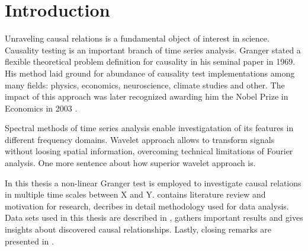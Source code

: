 \section{Introduction}

Unraveling causal relations is a fundamental object of interest in science.
Causality testing is an important branch of time series analysis.
Granger \cite{granger69} stated a flexible theoretical problem definition for causality in his seminal paper in 1969.
His method laid ground for abundance of causality test implementations among many fields:
physics, economics, neuroscience, climate studies and other. 
The impact of this approach was later recognized awarding him the Nobel Prize in Economics in 2003 \cite{nobel2003}. %

Spectral methods of time series analysis enable investigatation of its features in different frequency domains.
Wavelet approach allows to transform signals without loosing spatial information, overcoming technical limitations of Fourier analysis.
One more sentence about how superior wavelet approach is.

In this thesis a non-linear Granger test is employed to investigate causal relations in multiple time scales between X and Y.
 contains literature review and motivation for research,
 decribes in detail methodology used for data analysis.
Data sets used in this thesis are described in ,
 gathers important results and gives insights about discovered causal relationships.
Lastly, closing remarks are presented in .
